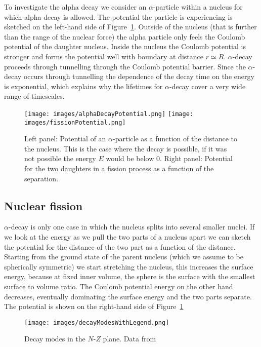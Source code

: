 \documentclass[12pt]{article}
\begin{document}
To investigate the alpha decay we consider an $\alpha$-particle within a nucleus for which alpha decay is allowed. The potential the particle is experiencing is sketched on the left-hand side of Figure~\ref{fig:fissionPotentials}. Outside of the nucleus (that is further than the range of the nuclear force) the alpha particle only feels the Coulomb potential of the daughter nucleus. Inside the nucleus the Coulomb potential is stronger and forms the potential well with boundary at distance $r\simeq R$. $\alpha$-decay proceeds through tunnelling through the Coulomb potential barrier. Since the $\alpha$-decay occurs through tunnelling the dependence of the decay time on the energy is exponential, which explains why the lifetimes for $\alpha$-decay cover a very wide range of timescales.    
\begin{figure}
\begin{center}
\texttt{[image: images/alphaDecayPotential.png]}
\texttt{[image: images/fissionPotential.png]}
\end{center}
\caption{Left panel: Potential of an $\alpha$-particle as a function of the distance to the nucleus. This is the case where the decay is possible, if it was not possible the energy $E$ would be below $0$. Right panel: Potential for the two daughters in a fission process as a function of the separation.}\label{fig:fissionPotentials}
\end{figure}
%
%
\subsection{Nuclear fission}
%
%
%
$\alpha$-decay is only one case in which the nucleus splits into several smaller nuclei. If we look at the energy as we pull the two parts of a nucleus apart we can sketch the potential for the distance of the two part as a function of the distance. Starting from the ground state of the parent nucleus (which we assume to be spherically symmetric) we start stretching the nucleus, this increases the surface energy, because at fixed inner volume, the sphere is the surface with the smallest surface to volume ratio. The Coulomb potential energy on the other hand decreases, eventually dominating the surface energy and the two parts separate. The potential is shown on the right-hand side of Figure~\ref{fig:fissionPotentials}
\begin{figure}
\begin{center}
\texttt{[image: images/decayModesWithLegend.png]}   
\end{center}
\caption{Decay modes in the $N$-$Z$ plane. Data from \cite{nndc}}\label{fig:decayModes}
\end{figure} 
\end{document}
